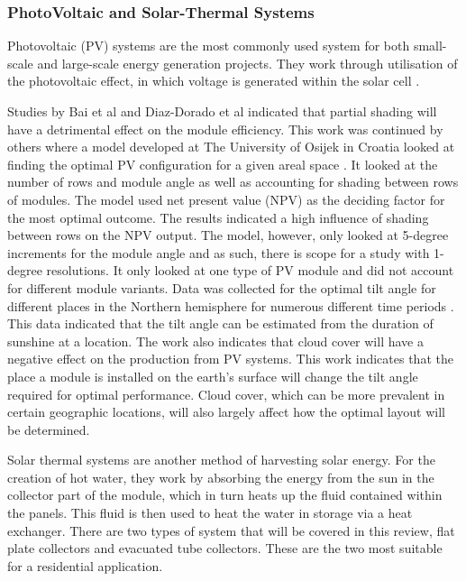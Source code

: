 \subsubsection{PhotoVoltaic and Solar-Thermal Systems}

Photovoltaic (PV) systems are the most commonly used system for both 
small-scale and large-scale energy generation projects. They work through 
utilisation of the photovoltaic effect, in which voltage is generated within 
the solar cell \cite{PVED}.

Studies by Bai et al \cite{BAI201541}and Diaz-Dorado et al \cite{Diaz} indicated that partial 
shading will have a detrimental effect on the module efficiency. This work 
was continued by others where a model developed at The University of Osijek 
in Croatia looked at finding the optimal PV configuration for a given areal 
space \cite{TOPIC2017750}. It looked at the number of rows and module angle as well as accounting 
for shading between rows of modules. The model used net present value (NPV) 
as the deciding factor for the most optimal outcome. The results indicated a 
high influence of shading between rows on the NPV output. The model, however, 
only looked at 5-degree increments for the module angle and as such, there is scope 
for a study with 1-degree resolutions. It only looked at one type of PV 
module and did not account for different module variants. Data was collected 
for the optimal tilt angle for different places in the Northern hemisphere 
for numerous different time periods \cite{CHANG20091274}. This data indicated that the tilt 
angle can be estimated from the duration of sunshine at a location. The work 
also indicates that cloud cover will have a negative effect on the production 
from PV systems. This work indicates that the place a module is installed on 
the earth’s surface will change the tilt angle required for optimal 
performance. Cloud cover, which can be more prevalent in certain geographic 
locations, will also largely affect how the optimal layout will be determined.

Solar thermal systems are another method of harvesting solar energy. 
For the creation of hot water, they work by absorbing the energy from the sun 
in the collector part of the module, which in turn heats up the fluid 
contained within the panels. This fluid is then used to heat the water in 
storage via a heat exchanger. There are two types of system that will be covered in this review, 
flat plate collectors and evacuated tube collectors. These are the two most 
suitable for a residential application.

